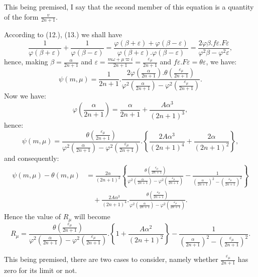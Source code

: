 \documentclass{article}
\begin{document}
This being premised, I say that the second member of this equation is a quantity of the form $\frac{v}{2n+1}$.


According to (12.), (13.) we shall have
\[ \frac{1}{\varphi(\beta+\varepsilon)}+\frac{1}{\varphi(\beta-\varepsilon)}=\frac{\varphi(\beta+\varepsilon)+\varphi(\beta-\varepsilon)}{\varphi(\beta+\varepsilon).\varphi(\beta-\varepsilon)}=\frac{2\varphi\beta.f\varepsilon.F\varepsilon}{\varphi^{2}\beta-\varphi^{2}\varepsilon}, \]
hence, making $\beta=\frac{\alpha}{2n+1}$ and $\varepsilon=\frac{m\omega+\mu\varpi i}{2n+1}=\frac{\varepsilon_{\mu}}{2n+1}$ and $f\varepsilon.F\varepsilon=\theta\varepsilon$, we have:
\[ \psi(m,\mu)=\frac{1}{2n+1}.\frac{2\varphi\left(\frac{\alpha}{2n+1}\right).\theta\left(\frac{\varepsilon_{\mu}}{2n+1}\right)}{\varphi^{2}\left(\frac{\alpha}{2n+1}\right)-\varphi^{2}\left(\frac{\varepsilon_{\mu}}{2n+1}\right)}. \]
Now we have:
\[ \varphi\left(\frac{\alpha}{2n+1}\right)=\frac{\alpha}{2n+1}+\frac{A\alpha^{3}}{(2n+1)^{3}}, \]
hence:
\[ \psi(m,\mu)=\frac{\theta\left(\frac{\varepsilon_{\mu}}{2n+1}\right)}{\varphi^{2}\left(\frac{\alpha}{2n+1}\right)-\varphi^{2}\left(\frac{\varepsilon_{\mu}}{2n+1}\right)}.\left\{\frac{2A\alpha^{3}}{(2n+1)^{4}}+\frac{2\alpha}{(2n+1)^{2}}\right\}, \]
and consequently:
\[ \begin{aligned}
\psi(m,\mu)-\theta(m,\mu)&=\frac{2\alpha}{(2n+1)^{2}}\left\{\frac{\theta\left(\frac{\varepsilon_{\mu}}{2n+1}\right)}{\varphi^{2}\left(\frac{\alpha}{2n+1}\right)-\varphi^{2}\left(\frac{\varepsilon_{\mu}}{2n+1}\right)}-\frac{1}{\left(\frac{\alpha}{2n+1}\right)^{2}-\left(\frac{\varepsilon_{\mu}}{2n+1}\right)^{2}}\right\}\\
&\quad+\frac{2A\alpha^{3}}{(2n+1)^{4}}.\frac{\theta\left(\frac{\varepsilon_{\mu}}{2n+1}\right)}{\varphi^{2}\left(\frac{\alpha}{2n+1}\right)-\varphi^{2}\left(\frac{\varepsilon_{\mu}}{2n+1}\right)}.
\end{aligned} \]
Hence the value of $R_{\mu}$ will become
\[ R_{\mu}=\frac{\theta\left(\frac{\varepsilon_{\mu}}{2n+1}\right)}{\varphi^{2}\left(\frac{\alpha}{2n+1}\right)-\varphi^{2}\left(\frac{\varepsilon_{\mu}}{2n+1}\right)}.\left\{1+\frac{A\alpha^{2}}{(2n+1)^{2}}\right\}-\frac{1}{\left(\frac{\alpha}{2n+1}\right)^{2}-\left(\frac{\varepsilon_{\mu}}{2n+1}\right)^{2}}. \tag{138.} \]

This being premised, there are two cases to consider, namely whether $\frac{\varepsilon_{\mu}}{2n+1}$ has zero for its limit or not.
\end{document}
